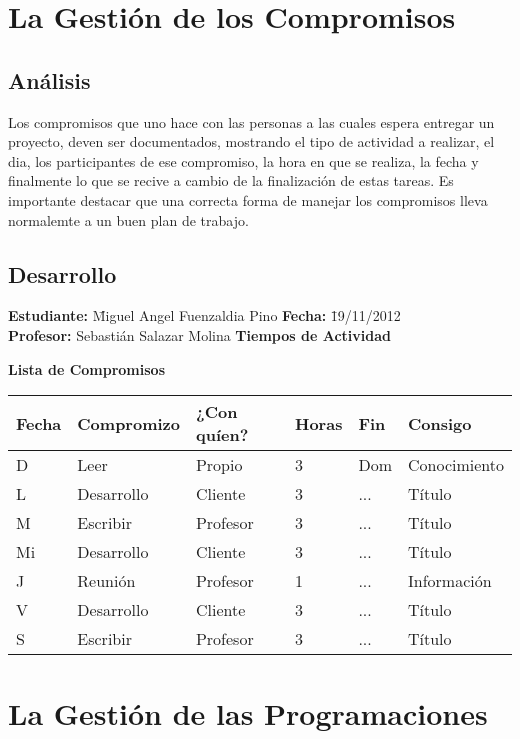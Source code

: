 \documentclass[a4paper,12pt,openany,oneside]{book}
\begin{document}
\chapter{La Gestión de los Compromisos}
\thispagestyle{empty}
\section{Análisis}
Los compromisos que uno hace con las personas a las cuales espera entregar un proyecto, deven ser documentados, mostrando el tipo de actividad a realizar, el dia, los participantes de ese compromiso, la hora en que se realiza, la fecha y finalmente lo que se recive a cambio de la finalización de estas tareas. Es importante destacar que una correcta forma de manejar los compromisos lleva normalemte a un buen plan de trabajo.
\section{Desarrollo}
\newpage
\begin{tabbing}
\textbf{Estudiante:} \= Miguel Angel Fuenzaldia Pino \= \textbf{Fecha:} \= 19/11/2012\\
\textbf{Profesor:} \> Sebastián Salazar Molina \> \textbf{Tiempos de Actividad} \>  \\
\end{tabbing}
\textbf{Lista de Compromisos}\\
\begin{tabular}{| l | l | l | l | l | l |}
\hline
\textbf{Fecha} & \textbf{Compromizo} & \textbf{¿Con quíen?} & \textbf{Horas} & \textbf{Fin} & \textbf{Consigo} \\
\hline
D  & Leer       & Propio   & 3 & Dom & Conocimiento \\
\hline
L  & Desarrollo & Cliente  & 3 & ... & Título \\
\hline
M  & Escribir   & Profesor & 3 & ... & Título \\
\hline
Mi & Desarrollo & Cliente  & 3 & ... & Título \\
\hline
J  & Reunión    & Profesor & 1 & ... & Información \\
\hline
V  & Desarrollo & Cliente  & 3 & ... & Título \\
\hline
S  & Escribir   & Profesor & 3 & ... & Título \\
\hline
\end{tabular}
\chapter{La Gestión de las Programaciones}
\thispagestyle{empty}
\end{document}
